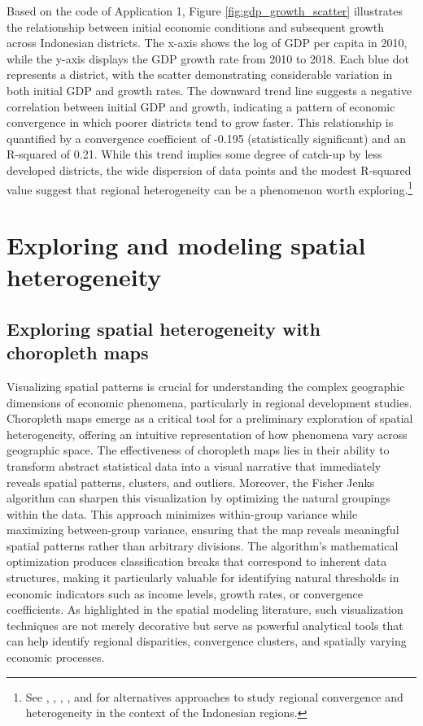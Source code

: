 \documentclass[smallextended, natbib]{svjour3}       %
\begin{document}
Based on the code of Application 1, Figure \ref{fig:gdp_growth_scatter}  illustrates the relationship between initial economic conditions and subsequent growth across Indonesian districts. 
The x-axis shows the log of GDP per capita in 2010, while the y-axis displays the GDP growth rate from 2010 to 2018. 
Each blue dot represents a district, with the scatter demonstrating considerable variation in both initial GDP and growth rates. 
The downward trend line suggests a negative correlation between initial GDP and growth, indicating a pattern of economic convergence in which poorer districts tend to grow faster.
This relationship is quantified by a convergence coefficient of -0.195 (statistically significant) and an R-squared of 0.21. 
While this trend implies some degree of catch-up by less developed districts, the wide dispersion of data points and the modest R-squared value suggest that regional heterogeneity can be a phenomenon worth exploring.\footnote{See \cite{gunawan2021provincial}, \cite{mendez2020regional},  \cite{mendez2021disparities}, \cite{miranti2023social},  and \cite{santos2022regional} for alternatives approaches to study regional convergence and heterogeneity in the context of the Indonesian regions.} 


\section{Exploring and modeling spatial heterogeneity}


\subsection{Exploring spatial heterogeneity with choropleth maps}

Visualizing spatial patterns is crucial for understanding the complex geographic dimensions of economic phenomena, particularly in regional development studies.
Choropleth maps emerge as a critical tool for a preliminary exploration of spatial heterogeneity, offering an intuitive representation of how phenomena vary across geographic space.
The effectiveness of choropleth maps lies in their ability to transform abstract statistical data into a visual narrative that immediately reveals spatial patterns, clusters, and outliers.
Moreover, the Fisher Jenks algorithm can sharpen this visualization by optimizing the natural groupings within the data. 
This approach minimizes within-group variance while maximizing between-group variance, ensuring that the map reveals meaningful spatial patterns rather than arbitrary divisions. 
The algorithm's mathematical optimization produces classification breaks that correspond to inherent data structures, making it particularly valuable for identifying natural thresholds in economic indicators such as income levels, growth rates, or convergence coefficients.
As highlighted in the spatial modeling literature, such visualization techniques are not merely decorative but serve as powerful analytical tools that can help identify regional disparities, convergence clusters, and spatially varying economic processes.
\end{document}
